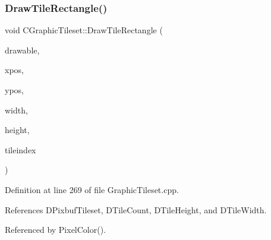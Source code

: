 \subsubsection{\texorpdfstring{Draw\+Tile\+Rectangle()}{DrawTileRectangle()}}
{\footnotesize\ttfamily void C\+Graphic\+Tileset\+::\+Draw\+Tile\+Rectangle (\begin{DoxyParamCaption}\item[{Gdk\+Drawable $\ast$}]{drawable,  }\item[{gint}]{xpos,  }\item[{gint}]{ypos,  }\item[{gint}]{width,  }\item[{gint}]{height,  }\item[{int}]{tileindex }\end{DoxyParamCaption})}



Definition at line 269 of file Graphic\+Tileset.\+cpp.



References D\+Pixbuf\+Tileset, D\+Tile\+Count, D\+Tile\+Height, and D\+Tile\+Width.



Referenced by Pixel\+Color().


